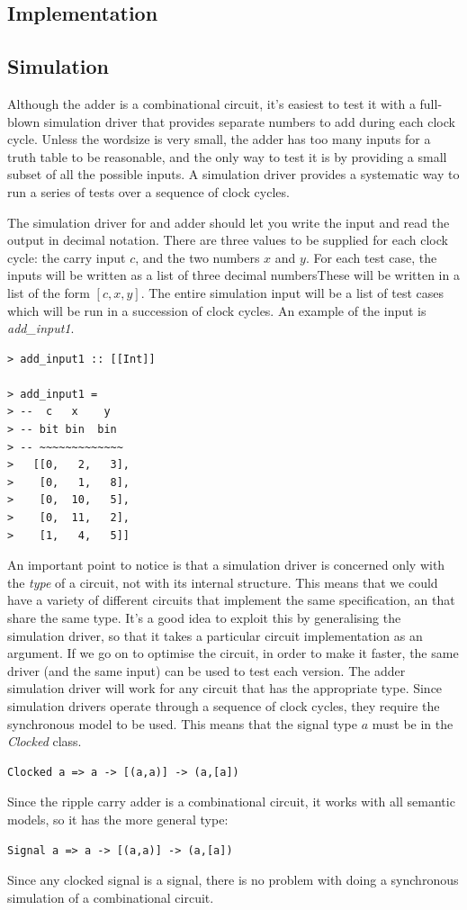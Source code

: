 \documentclass[a4paper,openany,fleqn]{book}
\begin{document}
\subsection{Implementation}
\label{sec:adder-implementation}

\subsection{Simulation}
\label{sec:adder-simulation}

Although the adder is a combinational circuit, it's easiest to test it
with a full-blown simulation driver that provides separate numbers to
add during each clock cycle.  Unless the wordsize is very small, the
adder has too many inputs for a truth table to be reasonable, and the
only way to test it is by providing a small subset of all the possible
inputs.  A simulation driver provides a systematic way to run a series
of tests over a sequence of clock cycles.

The simulation driver for and adder should let you write the input and
read the output in decimal notation.  There are three values to be
supplied for each clock cycle: the carry input $c$, and the two
numbers $x$ and $y$.  For each test case, the inputs will be written
as a list of three decimal numbersThese will be written in a list of
the form $[c, x, y]$.  The entire simulation input will be a list of
test cases which will be run in a succession of clock cycles.  An
example of the input is \textit{add\_input1}.

\begin{verbatim}
> add_input1 :: [[Int]]

> add_input1 =
> --  c   x    y
> -- bit bin  bin
> -- ~~~~~~~~~~~~~
>   [[0,   2,   3],
>    [0,   1,   8],
>    [0,  10,   5],
>    [0,  11,   2],
>    [1,   4,   5]]
\end{verbatim}

An important point to notice is that a simulation driver is concerned
only with the \emph{type} of a circuit, not with its internal
structure.  This means that we could have a variety of different
circuits that implement the same specification, an that share the same
type.  It's a good idea to exploit this by generalising the simulation
driver, so that it takes a particular circuit implementation as an
argument.  If we go on to optimise the circuit, in order to make it
faster, the same driver (and the same input) can be used to test each
version.  The adder simulation driver will work for any circuit that
has the appropriate type.  Since simulation drivers operate through a
sequence of clock cycles, they require the synchronous model to be
used. This means that the signal type $a$ must be in the
\textit{Clocked} class.
\begin{verbatim}
Clocked a => a -> [(a,a)] -> (a,[a])
\end{verbatim}
Since the ripple carry adder is a combinational circuit, it works with
all semantic models, so it has the more general type:
\begin{verbatim}
Signal a => a -> [(a,a)] -> (a,[a])
\end{verbatim}
Since any clocked signal is a signal, there is no problem with doing a
synchronous simulation of a combinational circuit.
\end{document}

